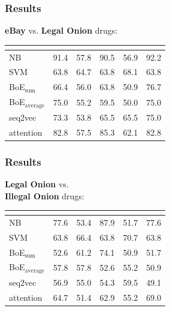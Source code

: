 \documentclass[t,xcolor={svgnames,table},aspectratio=169]{beamer}
\begin{document}
\begin{frame}
	\frametitle{Results}
	\Large
	\textbf{\color{yellow} eBay} vs. \textbf{\color{green} Legal Onion} drugs:
	
	\vspace{-1cm}
	\begin{center}
		\setlength{\tabcolsep}{8pt}
		\begin{tabular}{l *{5}{R}}
		& 
		& 
		& 
		& 
		& \\
		\hline
		NB & 91.4 & 57.8 & 90.5 & 56.9 & 92.2\\
		SVM & 63.8 & 64.7 & 63.8 & 68.1 & 63.8\\
		BoE$_\mathrm{sum}$ & 66.4 & 56.0 & 63.8 & 50.9 & 76.7\\
		BoE$_\mathrm{average}$ & 75.0 & 55.2 & 59.5 & 50.0 & 75.0\\
		seq2vec & 73.3 & 53.8 & 65.5 & 65.5 & 75.0\\
		attention & 82.8 & 57.5 & 85.3 & 62.1 & 82.8
		\end{tabular}
	\end{center}
\end{frame}

\begin{frame}
	\frametitle{Results}
	
	\Large
	\textbf{\color{green} Legal Onion} vs. \\ \textbf{\color{red} Illegal Onion} drugs:
	
	\vspace{-16mm}
	\begin{center}
		\setlength{\tabcolsep}{8pt}
		\begin{tabular}{l *{5}{R}}
		& 
		& 
		& 
		& 
		& \\
		\hline
		NB & 77.6 & 53.4 & 87.9 & 51.7 & 77.6\\
		SVM & 63.8 & 66.4 & 63.8 & 70.7 & 63.8\\
		BoE$_\mathrm{sum}$ & 52.6 & 61.2 & 74.1 & 50.9 & 51.7\\
		BoE$_\mathrm{average}$ & 57.8 & 57.8 & 52.6 & 55.2 & 50.9\\
		seq2vec & 56.9 & 55.0 & 54.3 & 59.5 & 49.1\\
		attention & 64.7 & 51.4 & 62.9 & 55.2 & 69.0
		\end{tabular}
	\end{center}
\end{frame}
\end{document}

